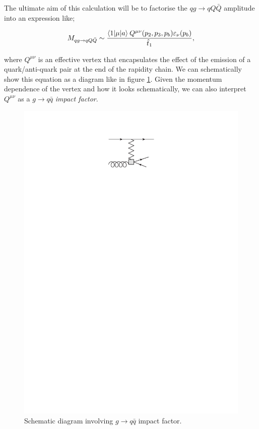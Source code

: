 The ultimate aim of this calculation will be to factorise the $qg \to qQ\bar{Q}$ amplitude into an expression like;

\begin{equation}
M_{qg \to qQ\bar{Q}} \sim \frac{\mathinner{\langle1\vert\mu\vert a\rangle}_{}Q^{\mu \nu}(p_2, p_3, p_b) \varepsilon_\nu(p_b)}{\hat{t}_1},
\label{eqn:NLLeqn}
\end{equation}

where $Q^{\mu \nu}$ is an effective vertex that encapsulates the effect of the emission of a quark/anti-quark pair at the end of the rapidity chain. We can schematically show this equation as a diagram like in figure \ref{fig:qgimp}. Given the momentum dependence of the vertex and how it looks schematically, we can also interpret $Q^{\mu \nu}$ as a $g \to q \bar{q}$ \emph{impact factor}.

\begin{figure}[t]
\centering
\includegraphics{Images/g_q_qbar_imp.pdf}
\caption{Schematic diagram involving $g \to q \bar{q}$ impact factor.}
\label{fig:qgimp}
\end{figure}

